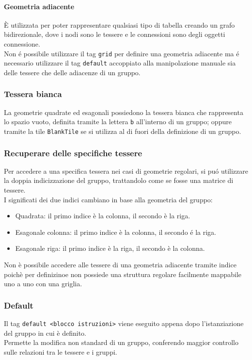 
\paragraph{Geometria adiacente}
È utilizzata per poter rappresentare qualsiasi tipo di tabella creando un grafo bidirezionale, dove
i nodi sono le tessere e le connessioni sono degli oggetti connessione. \\ 
Non é possibile utilizzare il tag \lstinline|grid| per definire una geometria adiacente ma é 
necessario utilizzare il tag \lstinline|default| accoppiato
alla manipolazione manuale sia delle tessere che delle adiacenze di un gruppo.

\subsubsection{Tessera bianca}
La geometrie quadrate ed esagonali possiedono la tessera bianca che rappresenta lo spazio vuoto, 
definita tramite la lettera \lstinline|b| all'interno di un gruppo; oppure tramite la tile \lstinline{BlankTile}
se si utilizza al di fuori della definizione di un gruppo.  

\subsubsection{Recuperare delle specifiche tessere}
Per accedere a una specifica tessera nei casi di geometrie regolari, si puó utilizzare la doppia
indicizzazione del gruppo, trattandolo come se fosse una matrice di tessere. \\
I significati dei due indici cambiano in base alla geometria del gruppo:
\begin{itemize}
    \item Quadrata: il primo indice è la colonna, il secondo è la riga.
    \item Esagonale colonna: il primo indice è la colonna, il secondo é la riga.
    \item Esagonale riga: il primo indice è la riga, il secondo è la colonna.
\end{itemize}
Non è possibile accedere alle tessere di una geometria adiacente tramite indice poichè per definizinoe
non possiede una struttura regolare facilmente mappabile uno a uno con una griglia. 

\subsubsection{Default}
Il tag \lstinline|default <blocco istruzioni>| viene eseguito appena dopo l'istanziazione 
del gruppo in cui è definito. \\
Permette la modifica non standard di un gruppo, conferendo maggior controllo sulle relazioni tra le tessere 
e i gruppi.

